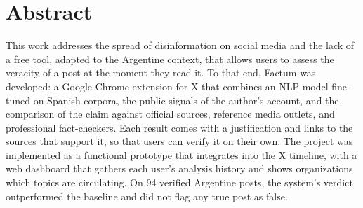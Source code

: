 \chapter*{Abstract}

This work addresses the spread of disinformation on social media and the lack of a free tool, adapted to the Argentine context, that allows users to assess the veracity of a post at the moment they read it. To that end, Factum was developed: a Google Chrome extension for X that combines an NLP model fine-tuned on Spanish corpora, the public signals of the author's account, and the comparison of the claim against official sources, reference media outlets, and professional fact-checkers. Each result comes with a justification and links to the sources that support it, so that users can verify it on their own. The project was implemented as a functional prototype that integrates into the X timeline, with a web dashboard that gathers each user's analysis history and shows organizations which topics are circulating. On 94 verified Argentine posts, the system's verdict outperformed the baseline and did not flag any true post as false.
